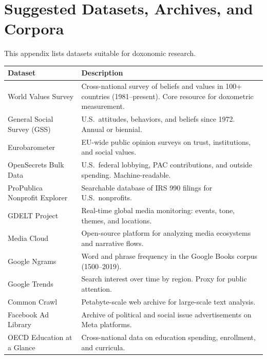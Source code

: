 \chapter{Suggested Datasets, Archives, and Corpora}
\label{app:datasets}

This appendix lists datasets suitable for doxonomic research.

\begin{longtable}{p{4cm} p{9.5cm}}
\toprule
\textbf{Dataset} & \textbf{Description} \\
\midrule
\endhead

World Values Survey & Cross-national survey of beliefs and values in 100+ countries (1981--present). Core resource for doxometric measurement. \\

General Social Survey (GSS) & U.S.\ attitudes, behaviors, and beliefs since 1972. Annual or biennial. \\

Eurobarometer & EU-wide public opinion surveys on trust, institutions, and social values. \\

OpenSecrets Bulk Data & U.S.\ federal lobbying, PAC contributions, and outside spending. Machine-readable. \\

ProPublica Nonprofit Explorer & Searchable database of IRS 990 filings for U.S.\ nonprofits. \\

GDELT Project & Real-time global media monitoring: events, tone, themes, and locations. \\

Media Cloud & Open-source platform for analyzing media ecosystems and narrative flows. \\

Google Ngrams & Word and phrase frequency in the Google Books corpus (1500--2019). \\

Google Trends & Search interest over time by region. Proxy for public attention. \\

Common Crawl & Petabyte-scale web archive for large-scale text analysis. \\

Facebook Ad Library & Archive of political and social issue advertisements on Meta platforms. \\

OECD Education at a Glance & Cross-national data on education spending, enrollment, and curricula. \\


\end{longtable}
